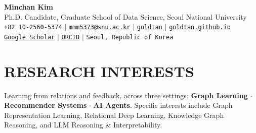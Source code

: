 \documentclass[letterpaper,11pt]{article}
\begin{document}
\begin{center}
    \textbf{\Huge \textcolor{accent}{Minchan Kim}} \\ \vspace{4pt}
    {\color{dark-grey} Ph.D. Candidate, Graduate School of Data Science, Seoul National University} \\ \vspace{6pt}
    \small \faPhone* \hspace{2pt}\texttt{+82 10-2560-5374} \hspace{1pt} $|$
    \hspace{1pt} \faEnvelope \hspace{2pt} \href{mailto:mmm5373@snu.ac.kr}{\texttt{mmm5373@snu.ac.kr}} \hspace{1pt} $|$
    \hspace{1pt} \faGithub \hspace{2pt} \href{https://github.com/goldtan}{\texttt{goldtan}} \hspace{1pt} $|$
    \hspace{1pt} \faGlobe \hspace{2pt} \href{https://goldtan.github.io/}{\texttt{goldtan.github.io}}
    \\ \vspace{3pt}
    \small \aiGoogleScholar \hspace{2pt} \href{https://scholar.google.com/citations?user=_i4rx-kAAAAJ}{\texttt{Google Scholar}} \hspace{1pt} $|$
    \hspace{1pt} \aiOrcid \hspace{2pt} \href{https://orcid.org/0009-0009-8776-4209}{\texttt{ORCID}} \hspace{1pt} $|$
    \hspace{1pt} \faMapMarker* \hspace{2pt}\texttt{Seoul, Republic of Korea}
    \\ \vspace{-3pt}
\end{center}


\section{RESEARCH INTERESTS}
\vspace{4pt}
\small Learning from relations and feedback, across three settings: \textbf{Graph Learning} $\cdot$ \textbf{Recommender Systems} $\cdot$ \textbf{AI Agents}. Specific interests include Graph Representation Learning, Relational Deep Learning, Knowledge Graph Reasoning, and LLM Reasoning \& Interpretability.
\vspace{4pt}
\end{document}
